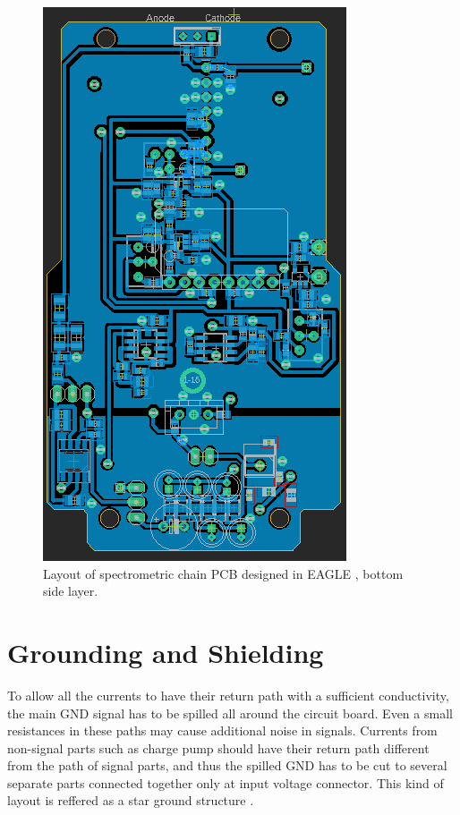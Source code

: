 \begin{figure}[H]
 \centering
 \includegraphics[scale=0.8, angle = 90]{./pictures/S14bottomLay.png}
 \caption{Layout of spectrometric chain PCB designed in EAGLE \cite{eagle}, bottom side layer.}
 \label{layout bottom}
 
\end{figure}
\newpage





\section{Grounding and Shielding}
To allow all the currents to have their return path with a sufficient conductivity, the main GND signal has to be spilled all around the circuit board. Even a small resistances in these paths may cause additional noise in signals. Currents from non-signal parts such as charge pump should have their return path different from the path of signal parts, and thus the spilled GND has to be cut to several separate parts connected together only at input voltage connector. This kind of layout is reffered as a star ground structure \cite{star}.

